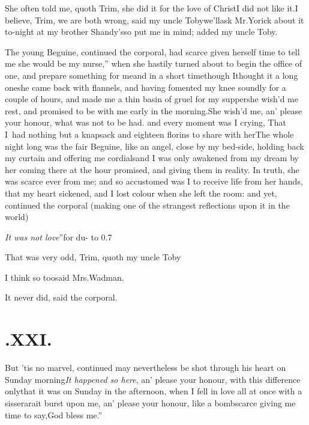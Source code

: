 \documentclass{article}
\begin{document}
\tsh She often told me, quoth Trim, she did it
for the love of Christ\tsk I did not like it.\tsh I
believe, Trim, we are both wrong, said my uncle
Toby\tsk we’ll\pb ask Mr.\@ Yorick about it
to-night at my brother Shandy’s\tsh so put me
in mind; added my uncle Toby.

The young Beguine, continued the corporal, had scarce
given herself time to tell me \lqq she would be my nurse,”\break
when she hastily turned about to begin the office of one, and
prepare something for me\tsh and in a short
time\tsk though I\break thought it a long one\tsk she came back with
flannels, \etc \etc and having fomented my knee soundly for a
couple of hours, \etc and made me a thin basin of gruel for my
supper\tsk she wish’d me rest, and promised to be with me
early in the morning.\tsh She wish’d me, an’
please your honour, what was not to be had.\pb 
{}
and every moment was I crying, That I~had nothing but a
knapsack and eighteen florins to share with her\tsh The
whole night long was the fair Beguine, like an angel, close
by my bed-side, holding back my curtain and offering me
cordials\tsk and I was only awakened from my dream by her coming
there at the hour promised, and giving them in reality. In truth,
she was scarce ever from me; and so accustomed was I to receive
life from her hands, that my heart sickened, and I lost colour when
she left the room: and yet, continued the corporal \pb
(making one of the strangest reflections upon it in
the world)\tsh

\tsh \lqq\textit{It was not love}”\tsh for du-\break
{}
\hbox to 0.7

That was very odd, Trim, quoth my uncle Toby\tsh

I think so too\tsk said Mrs.\@ Wadman.

It never did, said the corporal.

\newpage
\section{.\enspace XXI.}

\quad\tsh But ’tis no marvel, continued\break 
{}
\tsk may nevertheless be shot
through his heart on Sunday morning\tsh \textit{It
happened so here}, an’ please your honour, with this
difference only\tsk that it was on Sunday in the afternoon, when I fell in love all
at once with a sisserara\tsh it burst upon me, an’
please your honour, like a bomb\tsh scarce giving me time
to say,\break\lqq God bless me.”
\end{document}
